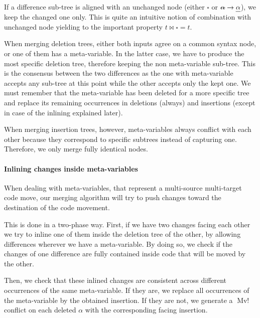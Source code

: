 \documentclass[a4paper,11pt]{article}
\newcommand\merge{\mathbin{\Join}}
\newcommand\mathst[1]{\text{\st{$#1$}}}
\newcommand\mathul[1]{\text{\ul{$#1$}}}
\newcommand\change[2]{\mathst{#1} \rightarrow \mathul{#2}}
\DeclareMathOperator\MvConflict{Mv!}
\newcommand\gb[1]{}%
\begin{document}
If a difference sub-tree is aligned with an unchanged node (either $\square$ or $\change{\alpha}{\alpha}$), we keep the changed one only. This is quite an intuitive notion of combination with unchanged node yielding to the important property $t \merge \square = t$.

When merging deletion trees, either both inputs agree on a common syntax node, or one of them has a meta-variable. In the latter case, we have to produce the most specific deletion tree, therefore keeping the non meta-variable sub-tree. This is the consensus between the two differences as the one with meta-variable accepts any sub-tree at this point while the other accepts only the kept one. We must remember that the meta-variable has been deleted for a more specific tree and replace its remaining occurrences in deletions (always) and insertions (except in case of the inlining explained later).

\gb{I probably should add an example here, but it is hard to find one that is non-conflicting, not complex and without inlining}

When merging insertion trees, however, meta-variables always conflict with each other because they correspond to specific subtrees instead of capturing one. Therefore, we only merge fully identical nodes.

\paragraph{Inlining changes inside meta-variables}
When dealing with meta-variables, that represent a multi-source
multi-target code move, our merging algorithm will try to push changes
toward the destination of the code movement.

This is done in a two-phase way. First, if we have two changes facing each other we try to inline one of them inside the deletion tree of the other, by allowing differences wherever we have a meta-variable. By doing so, we check if the changes of one difference are fully contained inside code that will be moved by the other.

Then, we check that these inlined changes are consistent across different occurrences of the same meta-variable. If they are, we replace all occurrences of the meta-variable by the obtained insertion. If they are not, we generate a $\MvConflict$ conflict on each deleted $\alpha$ with the corresponding facing insertion.
\end{document}
